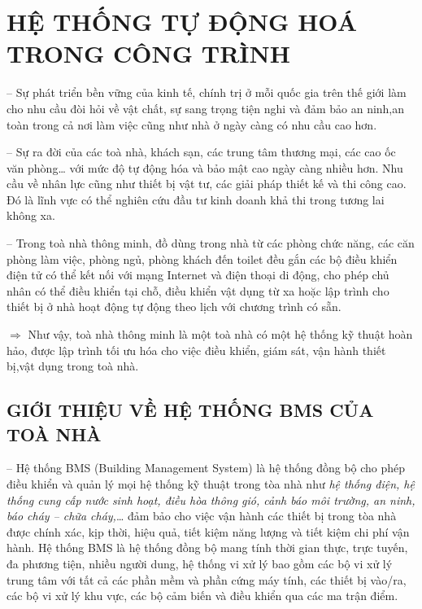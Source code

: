 	\section{HỆ THỐNG TỰ ĐỘNG HOÁ TRONG CÔNG TRÌNH}
	-- Sự phát triển bền vững của kinh tế, chính trị ở mỗi quốc gia trên thế giới làm cho nhu cầu đòi hỏi về vật chất, sự sang trọng tiện nghi và đảm bảo an ninh,an toàn trong cả nơi làm việc cũng như nhà ở ngày càng có nhu cầu cao hơn.

	-- Sự ra đời của các toà nhà, khách sạn, các trung tâm thương mại, các cao ốc văn phòng… với mức độ tự động hóa và bảo mật cao ngày càng nhiều hơn. Nhu cầu về nhân lực cũng như thiết bị vật tư, các giải pháp thiết kế và thi công cao. Đó là lĩnh vực có thể nghiên cứu đầu tư kinh doanh khả thi trong tương lai không xa.
	
	-- Trong toà nhà thông minh, đồ dùng trong nhà từ các phòng chức năng, các căn phòng làm việc, phòng ngủ, phòng khách đến toilet đều gắn các bộ điều khiển điện tử có thể kết nối với mạng Internet và điện thoại di động, cho phép chủ nhân có thể điều khiển tại chỗ, điều khiển vật dụng từ xa hoặc lập trình cho thiết bị ở nhà hoạt động tự động theo lịch với chương trình có sẵn.
	
	{\large $\pmb{\Rightarrow}$} Như vậy, toà nhà thông minh là một toà nhà có một hệ thống kỹ thuật hoàn hảo, được lập trình tối ưu hóa cho việc điều khiển, giám sát, vận hành thiết bị,vật dụng trong toà nhà.	
	\subsection{GIỚI THIỆU VỀ HỆ THỐNG BMS CỦA TOÀ NHÀ}
	-- Hệ thống BMS (Building Management System) là hệ thống đồng bộ cho phép điều khiển và quản lý mọi hệ thống kỹ thuật trong tòa nhà như \emph{hệ thống điện, hệ thống cung cấp nước sinh hoạt, điều hòa thông gió, cảnh báo môi trường, an ninh, báo cháy – chữa cháy,}… đảm bảo cho việc vận hành các thiết bị trong tòa nhà được chính xác, kịp thời, hiệu quả, tiết kiệm năng lượng và tiết kiệm chi phí vận hành. Hệ thống BMS là hệ thống đồng bộ mang tính thời gian thực, trực tuyến, đa phương tiện, nhiều người dung, hệ thống vi xử lý bao gồm các bộ vi xử lý trung tâm với tất cả các phần mềm và phần cứng máy tính, các thiết bị vào/ra, các bộ vi xử lý khu vực, các bộ cảm biến và điều khiển qua các ma trận điểm.
	
